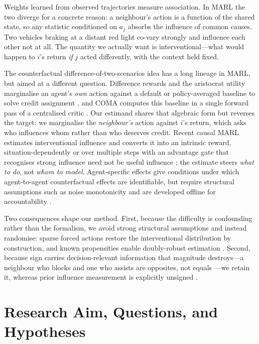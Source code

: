 \documentclass[conference]{IEEEtran}
\begin{document}
Weights learned from observed trajectories measure association. In MARL the two diverge for a concrete reason: a neighbour's action is a function of the shared state, so any statistic conditioned on $a_j$ absorbs the influence of common causes. Two vehicles braking at a distant red light co-vary strongly and influence each other not at all. The quantity we actually want is interventional---what would happen to $i$'s return \emph{if} $j$ acted differently, with the context held fixed.

The counterfactual difference-of-two-scenarios idea has a long lineage in MARL, but aimed at a different question. Difference rewards and the aristocrat utility marginalise an agent's \emph{own} action against a default or policy-averaged baseline to solve credit assignment \cite{wolpert2002difference, tumer2007aristocrat}, and COMA computes this baseline in a single forward pass of a centralised critic \cite{foerster2018coma}. Our estimand shares that algebraic form but reverses the target: we marginalise the \emph{neighbour's} action against $i$'s return, which asks who influences whom rather than who deserves credit. Recent causal MARL estimates interventional influence and converts it into an intrinsic reward, situation-dependently \cite{du2024scic} or over multiple steps with an advantage gate that recognises strong influence need not be useful influence \cite{yu2026magic}; the estimate steers \emph{what to do}, not \emph{whom to model}. Agent-specific effects give conditions under which agent-to-agent counterfactual effects are identifiable, but require structural assumptions such as noise monotonicity and are developed offline for accountability \cite{triantafyllou2024ase}.

Two consequences shape our method. First, because the difficulty is confounding rather than the formalism, we avoid strong structural assumptions and instead randomise: sparse forced actions restore the interventional distribution by construction, and known propensities enable doubly-robust estimation \cite{jiang2016dr, thomas2016hcope}. Second, because sign carries decision-relevant information that magnitude destroys---a neighbour who blocks and one who assists are opposites, not equals \cite{yu2026magic}---we retain it, whereas prior influence measurement is explicitly unsigned \cite{pieroth2024influence}.

\section{Research Aim, Questions, and Hypotheses}
\end{document}

